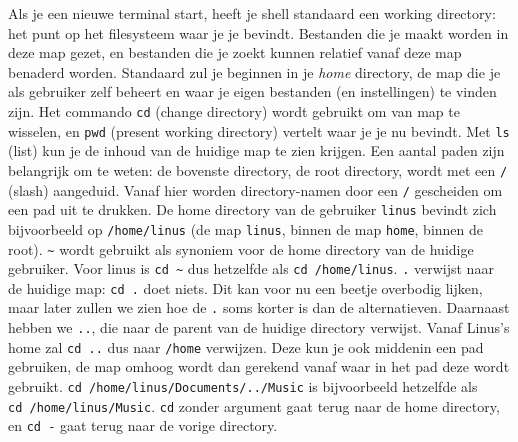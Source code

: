 Als je een nieuwe terminal start, heeft je shell standaard een working directory: het punt op het filesysteem waar je je bevindt. Bestanden die je maakt worden in deze map gezet, en bestanden die je zoekt kunnen relatief vanaf deze map benaderd worden. Standaard zul je beginnen in je \emph{home} directory, de map die je als gebruiker zelf beheert en waar je eigen bestanden (en instellingen) te vinden zijn. Het commando \texttt{cd} (change directory) wordt gebruikt om van map te wisselen, en \texttt{pwd} (present working directory) vertelt waar je je nu bevindt. Met \texttt{ls} (list) kun je de inhoud van de huidige map te zien krijgen. Een aantal paden zijn belangrijk om te weten: de bovenste directory, de root directory, wordt met een \texttt{/} (slash) aangeduid. Vanaf hier worden directory-namen door een \texttt{/} gescheiden om een pad uit te drukken. De home directory van de gebruiker \texttt{linus} bevindt zich bijvoorbeeld op \texttt{/home/linus} (de map \texttt{linus}, binnen de map \texttt{home}, binnen de root). \texttt{\textasciitilde} wordt gebruikt als synoniem voor de home directory van de huidige gebruiker. Voor linus is \texttt{cd\ \textasciitilde} dus hetzelfde als \texttt{cd\ /home/linus}. \texttt{.} verwijst naar de huidige map: \texttt{cd\ .} doet niets. Dit kan voor nu een beetje overbodig lijken, maar later zullen we zien hoe de \texttt{.} soms korter is dan de alternatieven. Daarnaast hebben we \texttt{..}, die naar de parent van de huidige directory verwijst. Vanaf Linus's home zal \texttt{cd\ ..} dus naar \texttt{/home} verwijzen. Deze kun je ook middenin een pad gebruiken, de map omhoog wordt dan gerekend vanaf waar in het pad deze wordt gebruikt. \texttt{cd\ /home/linus/Documents/../Music} is bijvoorbeeld hetzelfde als \texttt{cd\ /home/linus/Music}. \texttt{cd} zonder argument gaat terug naar de home directory, en \texttt{cd\ -} gaat terug naar de vorige directory.

